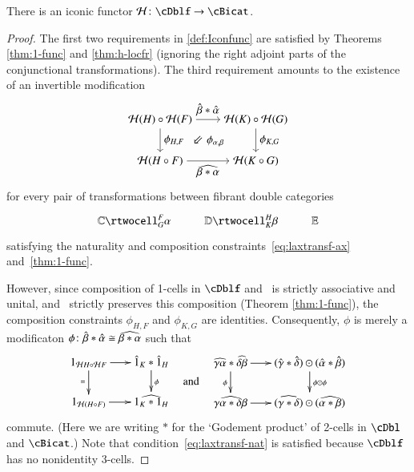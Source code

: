 \begin{thm}\label{thm:h-functor}
  There is an iconic functor $\cH\maps \cDblf\to \cBicat$.
\end{thm}
\begin{proof}
The first two requirements in \autoref{def:Iconfunc} are satisfied by Theorems \ref{thm:1-func} and \ref{thm:h-locfr} (ignoring the right adjoint parts of the conjunctional transformations).
The third requirement amounts to the existence of an invertible modification
%
\begin{equation}
\begin{tikzpicture}[xscale=0.75, yscale=1.3]
\node (tl) at (0,2) {${\cH}(H) \circ {\cH}(F)$};
\node (bl) at (0,1) {${\cH}(H \circ F)$};
\node (tr) at (4,2) {${\cH}(K) \circ {\cH}(G)$};
\node (br) at (4,1) {${\cH}(K \circ G)$};
\draw[->] (tl) to node [above] {$\hat{\beta} * \hat{\alpha}$} (tr);
\draw[->] (tr) to node [right] {$\phi_{K,G}$} (br);
\draw[->] (tl) to node [right] {$\phi_{H,F}$} (bl);
\draw[->] (bl) to node [below] {$\widehat{\be*\al}$} (br);
\node at (2,1.5) {$\Arrow{5} \phi_{\alpha,\beta} $};
\end{tikzpicture}
\end{equation}
%
for every pair of transformations between fibrant double categories
  \[\vcenter{\xymatrix{\lC \rtwocell^F_G{\al} & \lD \rtwocell^H_K{\be}
      & \lE}}\]
satisfying the naturality and composition constraints~\eqref{eq:laxtransf-ax} and~\eqref{thm:1-func}.

However, since composition of
  1-cells in $\cDblf$ and \cBicat\ is strictly associative and
  unital, and \cH\ strictly preserves this composition (Theorem \ref{thm:1-func}),
  the composition constraints $\phi_{H,F}$ and $\phi_{K,G}$ are identities. Consequently, $\phi$ is merely  a modificaton $\phi\colon \hat{\beta} * \hat{\alpha} \cong \widehat{\beta*\alpha}$ such that 
%
 \begin{equation}
        \vcenter{\xymatrix@-.5pc{
        1_{{\cH}H \circ {\cH}F} \ar[r]\ar[d]_{=} &
        \hat{1}_{K}*\hat{1}_{H}\ar[d]^{\phi}\\
        1_{{\cH}(H \circ F)}\ar[r] &
        \widehat{1_{K} *1_{H}}}} \quad\text{and}\quad       
    \vcenter{\xymatrix@-.5pc{
        \widehat{\gm\al}*\widehat{\de\be} \ar[r]\ar[d]_\phi &
        (\gmhat*\dehat)\odot(\alhat*\behat)\ar[d]^{\phi \odot \phi}\\
        \widehat{\gm\al*\de\be}\ar[r] &
        (\widehat{\gm*\de})\odot(\widehat{\al*\be})}}
  \end{equation}
commute. (Here we are writing $*$ for the `Godement product' of 2-cells in $\cDbl$ and $\cBicat$.)    
Note that condition~\eqref{eq:laxtransf-nat} is satisfied because $\cDblf$ has no nonidentity 3-cells.
  

\end{proof}
